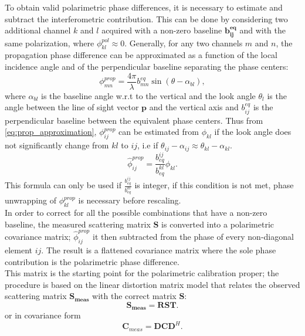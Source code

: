 To obtain valid polarimetric phase differences, it is necessary to estimate and subtract the interferometric contribution. This can be done  by considering two additional channel $k$ and $l$  acquired with  a non-zero baseline $\mathbf{b_{ij}^{eq}}$ and with the same polarization, where $\phi_{kl}^{pol} \approx 0$. Generally, for any two channels $m$ and $n$,  the propagation phase difference can be approximated as a function of the local incidence angle and of the perpendicular baseline separating the phase centers:
\begin{equation}\label{eq:prop_approximation}
		\phi_{mn}^{prop} = \frac{4\pi}{\lambda} b_{mn}^{eq} \sin(\theta - \alpha_{bl}),
\end{equation}
where $\alpha_{bl}$ is the baseline angle w.r.t to the vertical and the look angle $\theta_l$ is the angle between the line of sight vector $\mathbf{p}$ and the vertical axis and $b_{ij}^{eq}$ is the perpendicular baseline between the equivalent phase centers.
Thus from \autoref{eq:prop_approximation}, $\phi_{ij}^{prop}$ can be estimated from $\phi_{kl}$ if the look angle does not significantly change from $kl$ to $ij$, i.e if $\theta_{ij} - \alpha_{ij} \approx \theta_{kl} - \alpha_{kl}$. 
\begin{equation}
	\hat{\phi}_{ij}^{prop} = \frac{b_{eq}^{ij}}{b_{eq}^{kl}} \phi_{kl}.
\end{equation}
This formula can only be used if $\frac{b_{eq}^{ij}}{b_{eq}^{kl}}$ is integer\cite{Massonnet1996}, if this condition is not met, phase unwrapping of $\phi_{kl}^{prop}$ is necessary before rescaling.\\
In order to correct for all the possible combinations that have a non-zero baseline, the measured scattering matrix $\mathbf{S}$ is converted into a polarimetric covariance matrix;  $\hat{\phi}_{ij}^{prop}$ it then subtracted from the phase of every non-diagonal element $ij$. The result is a flattened covariance matrix where the sole phase contribution is the polarimetric phase difference.\\
This matrix is the starting point for the polarimetric calibration proper;
the procedure is based on the linear distortion matrix model\cite{Saraband1990, Sarabandi1992a} that relates the observed scattering matrix $\mathbf{S_{meas}}$ with the correct matrix $\mathbf{S}$:
\begin{equation}\label{eq:distorsion_scattering}
	\mathbf{S_{meas}} = \mathbf{R} \mathbf{S} \mathbf{T}.
\end{equation}
or in covariance form
\begin{equation}\label{eq:covariance_distortion}
	\mathbf{C}_{meas} = \mathbf{D} \mathbf{C} \mathbf{D}^{H}.
\end{equation}
